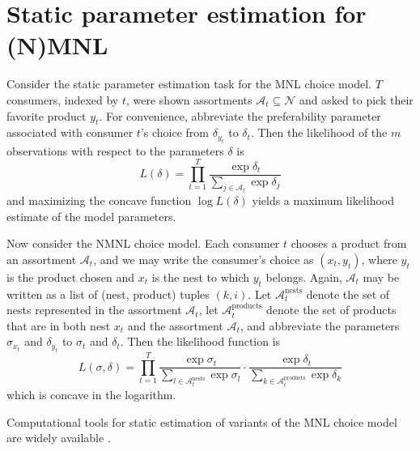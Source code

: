 \documentclass[preprint,12pt,authoryear]{elsarticle}
\begin{document}
\section{Static parameter estimation for (N)MNL} \label{staticestimation}
Consider the static parameter estimation task for the MNL choice model. $T$ consumers, indexed by $t$, were shown assortments $\mathcal{A}_t \subseteq \mathcal{N}$ and asked to pick their favorite product $y_t$. For convenience, abbreviate the preferability parameter associated with consumer $t$'s choice from $\delta_{y_t}$ to $\delta_t$. Then the likelihood of the $m$ observations with respect to the parameters $\delta$ is
\begin{equation} \label{mnllikelihood}
L(\delta) = \prod_{t=1}^T \frac{\exp \delta_t}{\sum_{j\in \mathcal{A}_t} \exp \delta_j}
\end{equation}
and maximizing the concave function $\log L(\delta)$ yields a maximum likelihood estimate of the model parameters.

Now consider the NMNL choice model. Each consumer $t$ chooses a product from an assortment $\mathcal{A}_t$, and we may write the consumer's choice as $(x_t, y_t)$, where $y_t$ is the product chosen and $x_t$ is the nest to which $y_t$ belongs. Again, $\mathcal{A}_t$ may be written as a list of (nest, product) tuples $(k, i)$. Let $\mathcal{A}_t^{\text{nests}}$ denote the set of nests represented in the assortment $\mathcal{A}_t$, let $\mathcal{A}_{t}^{\text{products}}$ denote the set of products that are in both nest $x_t$ and the assortment $\mathcal{A}_t$, and abbreviate the parameters $\sigma_{x_t}$ and $\delta_{y_t}$ to $\sigma_t$ and $\delta_t$. Then the likelihood function is
\begin{equation}L(\sigma, \delta) = \prod_{t=1}^T \frac{\exp \sigma_t}{\sum_{l\in \mathcal{A}_t^{\text{nests}}} \exp \sigma_l} \cdot \frac{\exp \delta_t}{\sum_{k \in \mathcal{A}_{t}^{\text{products}}} \exp \delta_k}\end{equation}
which is concave in the logarithm.

Computational tools for static estimation of variants of the MNL choice model are widely available \cite[e.g.][]{croissantnd}.
\end{document}
